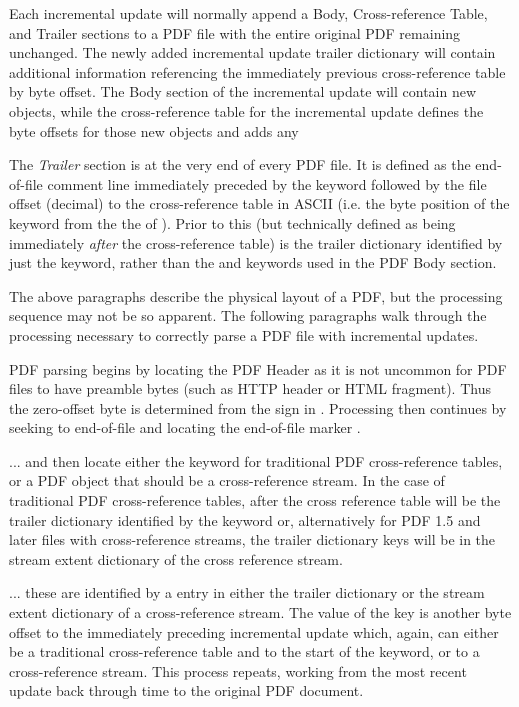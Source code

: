 Each incremental update will normally append a Body, Cross-reference Table, and Trailer sections to a PDF file with the entire original PDF remaining unchanged. The newly added incremental update trailer dictionary will contain additional information referencing the immediately previous cross-reference table by byte offset. The Body section of the incremental update will contain new objects, while the cross-reference table for the incremental update defines the byte offsets for those new objects and adds any  

The \emph{Trailer} section is at the very end of every PDF file. 
It is defined as the end-of-file comment line  immediately
preceded by the  keyword followed by the file offset (decimal) to 
the cross-reference table in ASCII (i.e. the byte position of the  keyword 
from the the \lstcd{\%} of ). Prior to this (but technically 
defined as being immediately \emph{after} the cross-reference table) is the trailer dictionary
identified by just the  keyword, rather than the  and 
keywords used in the PDF Body section.

The above paragraphs describe the physical layout of a PDF, but the processing sequence may not be so apparent. The following paragraphs walk through the processing necessary to correctly parse a PDF file with incremental updates.

PDF parsing begins by locating the PDF Header as it is not uncommon for PDF files to have 
preamble bytes (such as HTTP header or HTML fragment). Thus the zero-offset byte is 
determined from the \lstcd{\%} sign in . Processing then continues by
seeking to end-of-file and locating the end-of-file marker .


... and then locate either the  keyword for
traditional PDF cross-reference tables, or a PDF object that should be
a cross-reference stream.  In the case of traditional PDF
cross-reference tables, after the cross reference table will be the
trailer dictionary identified by the  keyword or,
alternatively for PDF 1.5 and later files with cross-reference
streams, the trailer dictionary keys will be in the stream extent
dictionary of the cross reference stream.

... these are identified by a  entry in either the trailer
dictionary or the stream extent dictionary of a cross-reference stream. The
value of the  key is another byte offset to the immediately
preceding incremental update which, again, can either be a traditional
cross-reference table and to the start of the  keyword, or to a
cross-reference stream. This process repeats, working from the most recent
update back through time to the original PDF document.

